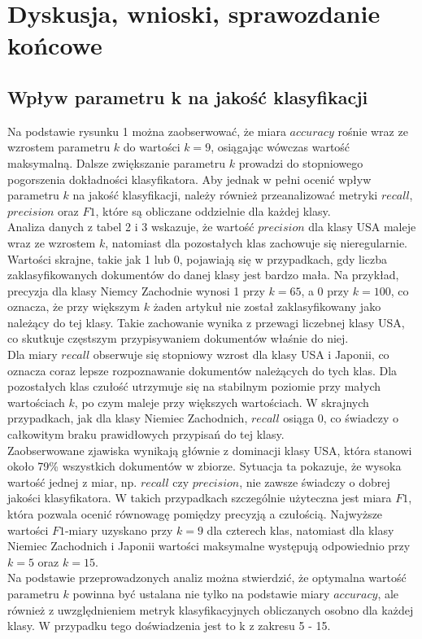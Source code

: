 \documentclass{article}
\begin{document}
\section{Dyskusja, wnioski, sprawozdanie końcowe}
\subsection{Wpływ parametru k na jakość klasyfikacji}
Na podstawie rysunku 1 można zaobserwować, że miara \(accuracy\) rośnie wraz ze wzrostem parametru \(k\) do wartości \(k = 9\), osiągając wówczas wartość maksymalną. Dalsze zwiększanie parametru \(k\) prowadzi do stopniowego pogorszenia dokładności klasyfikatora. Aby jednak w pełni ocenić wpływ parametru \(k\) na jakość klasyfikacji, należy również przeanalizować metryki \(recall\), \(precision\) oraz \(F1\), które są obliczane oddzielnie dla każdej klasy. \\
Analiza danych z tabel 2 i 3 wskazuje, że wartość \(precision\) dla klasy USA maleje wraz ze wzrostem \(k\), natomiast dla pozostałych klas zachowuje się nieregularnie. Wartości skrajne, takie jak 1 lub 0, pojawiają się w przypadkach, gdy liczba zaklasyfikowanych dokumentów do danej klasy jest bardzo mała. Na przykład, precyzja dla klasy Niemcy Zachodnie wynosi 1 przy \(k = 65\), a 0 przy \(k = 100\), co oznacza, że przy większym \(k\) żaden artykuł nie został zaklasyfikowany jako należący do tej klasy. Takie zachowanie wynika z przewagi liczebnej klasy USA, co skutkuje częstszym przypisywaniem dokumentów właśnie do niej. \\ 
Dla miary \(recall\) obserwuje się stopniowy wzrost dla klasy USA i Japonii, co oznacza coraz lepsze rozpoznawanie dokumentów należących do tych klas. Dla pozostałych klas czułość utrzymuje się na stabilnym poziomie przy małych wartościach \(k\), po czym maleje przy większych wartościach. W skrajnych przypadkach, jak dla klasy Niemiec Zachodnich, \(recall\) osiąga 0, co świadczy o całkowitym braku prawidłowych przypisań do tej klasy.\\
Zaobserwowane zjawiska wynikają głównie z dominacji klasy USA, która stanowi około 79\% wszystkich dokumentów w zbiorze. Sytuacja ta pokazuje, że wysoka wartość jednej z miar, np. \(recall\) czy \(precision\), nie zawsze świadczy o dobrej jakości klasyfikatora. W takich przypadkach szczególnie użyteczna jest miara \(F1\), która pozwala ocenić równowagę pomiędzy precyzją a czułością. Najwyższe wartości \(F1\)-miary uzyskano przy \(k = 9\) dla czterech klas, natomiast dla klasy Niemiec Zachodnich i Japonii wartości maksymalne występują odpowiednio przy \(k = 5\) oraz \(k = 15\). \\
Na podstawie przeprowadzonych analiz można stwierdzić, że optymalna wartość parametru \(k\) powinna być ustalana nie tylko na podstawie miary \(accuracy\), ale również z uwzględnieniem metryk klasyfikacyjnych obliczanych osobno dla każdej klasy. W przypadku tego doświadzenia jest to k z zakresu 5 - 15.
\end{document}
